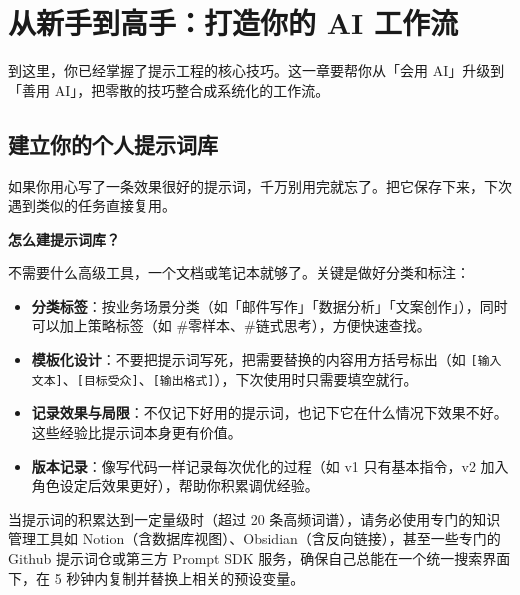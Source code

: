% 
% 


\chapter{从新手到高手：打造你的 AI 工作流}
\label{ch:workflow}

到这里，你已经掌握了提示工程的核心技巧。这一章要帮你从「会用 AI」升级到「善用 AI」，把零散的技巧整合成系统化的工作流。

\section{建立你的个人提示词库}

如果你用心写了一条效果很好的提示词，千万别用完就忘了。把它保存下来，下次遇到类似的任务直接复用。

\textbf{怎么建提示词库？}

不需要什么高级工具，一个文档或笔记本就够了。关键是做好分类和标注：

\begin{itemize}
  \item \textbf{分类标签}：按业务场景分类（如「邮件写作」「数据分析」「文案创作」），同时可以加上策略标签（如 \#零样本、\#链式思考），方便快速查找。
  \item \textbf{模板化设计}：不要把提示词写死，把需要替换的内容用方括号标出（如 \verb|[输入文本]|、\verb|[目标受众]|、\verb|[输出格式]|），下次使用时只需要填空就行。
  \item \textbf{记录效果与局限}：不仅记下好用的提示词，也记下它在什么情况下效果不好。这些经验比提示词本身更有价值。
  \item \textbf{版本记录}：像写代码一样记录每次优化的过程（如 v1 只有基本指令，v2 加入角色设定后效果更好），帮助你积累调优经验。
\end{itemize}

\begin{tipbox}
当提示词的积累达到一定量级时（超过 20 条高频词谱），请务必使用专门的知识管理工具如 Notion（含数据库视图）、Obsidian（含反向链接），甚至一些专门的 Github 提示词仓或第三方 Prompt SDK 服务，确保自己总能在一个统一搜索界面下，在 5 秒钟内复制并替换上相关的预设变量。
\end{tipbox}

